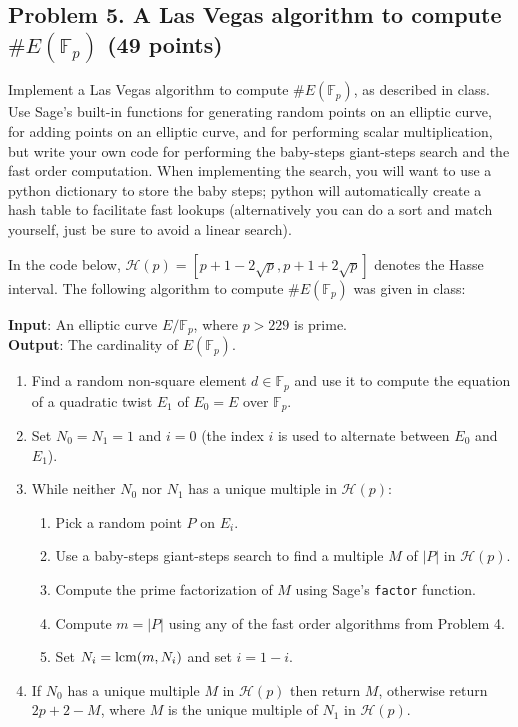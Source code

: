\documentclass[11pt]{article}
\newcommand{\Fp}{\mathbb{F}_p}
\newcommand{\lcm}{{\rm lcm}}
\begin{document}
\subsection*{Problem 5. A Las Vegas algorithm to compute $\#E(\Fp)$ (49 points)}
Implement a Las Vegas algorithm to compute $\#E(\Fp)$, as described in class.
Use Sage's built-in functions for generating random points on an elliptic curve, for adding
points on an elliptic curve, and for performing scalar multiplication, but write your own
code for performing the baby-steps giant-steps search and the fast order computation.
When implementing the search, you will want to use a python dictionary to store the baby steps; python will automatically create a hash table to facilitate fast lookups (alternatively you can do a sort and match yourself, just be sure to avoid a linear search).

In the code below, $\mathcal{H}(p)=[p+1-2\sqrt{p},p+1+2\sqrt{p}]$ denotes the Hasse interval.
The following algorithm to compute $\#E(\Fp)$ was given in class:
\bigskip\bigskip

\noindent
\textbf{Input}: An elliptic curve $E/\Fp$, where $p>229$ is prime.\\
\noindent
\textbf{Output}: The cardinality of $E(\Fp)$.
\begin{enumerate}
\item Find a random non-square element $d\in\Fp$ and use it to compute the equation
of a quadratic twist $E_1$ of $E_0=E$ over $\Fp$.
\item Set $N_0=N_1=1$ and $i=0$ (the index $i$ is used to alternate between $E_0$ and $E_1$).
\item While neither $N_0$ nor $N_1$ has a unique multiple in $\mathcal{H}(p)$:
\begin{enumerate}
\item Pick a random point $P$ on $E_i$.
\item Use a baby-steps giant-steps search to find a multiple $M$ of $|P|$ in $\mathcal{H}(p)$.
\item Compute the prime factorization of $M$ using Sage's \texttt{factor} function.
\item Compute $m=|P|$ using any of the fast order algorithms from Problem 4.
\item Set $N_i=\lcm(m,N_i)$ and set $i=1-i$.
\end{enumerate}
\item If $N_0$ has a unique multiple $M$ in $\mathcal{H}(p)$ then return $M$, otherwise return $2p+2-M$, where $M$ is the unique multiple of $N_1$ in $\mathcal{H}(p)$.
\end{enumerate}
\end{document}
